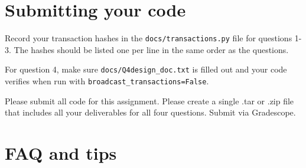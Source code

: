 \documentclass[11pt]{article}
\begin{document}
\section{Submitting your code}
Record your transaction hashes in the \texttt{docs/transactions.py} file for questions 1-3. The hashes should be listed one per line in the same order as the questions.

\hspace{20pt}For question 4, make sure \texttt{docs/Q4design\_doc.txt} is filled out and your code verifies when run with \texttt{broadcast\_transactions=False}.

\hspace{20pt}Please submit all code for this assignment. Please create a single .tar or .zip file that includes all your deliverables for all four questions. Submit via Gradescope.

\section{FAQ and tips}
\end{document}
